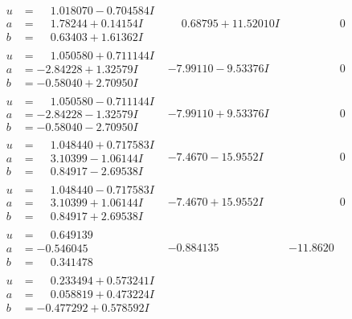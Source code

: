 \documentclass[1p]{elsarticle_modified}
\theoremstyle{definition}
\begin{document}
$$\begin{array}{c|c|c}
\begin{aligned}
u &= \phantom{-}1.018070 - 0.704584 I \\
a &= \phantom{-}1.78244 + 0.14154 I \\
b &= \phantom{-}0.63403 + 1.61362 I\end{aligned}
 & \phantom{-}0.68795 + 11.52010 I & \phantom{-0.000000 } 0 \\ \hline\begin{aligned}
u &= \phantom{-}1.050580 + 0.711144 I \\
a &= -2.84228 + 1.32579 I \\
b &= -0.58040 + 2.70950 I\end{aligned}
 & -7.99110 - 9.53376 I & \phantom{-0.000000 } 0 \\ \hline\begin{aligned}
u &= \phantom{-}1.050580 - 0.711144 I \\
a &= -2.84228 - 1.32579 I \\
b &= -0.58040 - 2.70950 I\end{aligned}
 & -7.99110 + 9.53376 I & \phantom{-0.000000 } 0 \\ \hline\begin{aligned}
u &= \phantom{-}1.048440 + 0.717583 I \\
a &= \phantom{-}3.10399 - 1.06144 I \\
b &= \phantom{-}0.84917 - 2.69538 I\end{aligned}
 & -7.4670 - 15.9552 I & \phantom{-0.000000 } 0 \\ \hline\begin{aligned}
u &= \phantom{-}1.048440 - 0.717583 I \\
a &= \phantom{-}3.10399 + 1.06144 I \\
b &= \phantom{-}0.84917 + 2.69538 I\end{aligned}
 & -7.4670 + 15.9552 I & \phantom{-0.000000 } 0 \\ \hline\begin{aligned}
u &= \phantom{-}0.649139\phantom{ +0.000000I} \\
a &= -0.546045\phantom{ +0.000000I} \\
b &= \phantom{-}0.341478\phantom{ +0.000000I}\end{aligned}
 & -0.884135\phantom{ +0.000000I} & -11.8620\phantom{ +0.000000I} \\ \hline\begin{aligned}
u &= \phantom{-}0.233494 + 0.573241 I \\
a &= \phantom{-}0.058819 + 0.473224 I \\
b &= -0.477292 + 0.578592 I\end{aligned}

\end{array}$$
\end{document}
